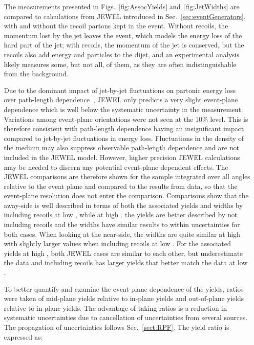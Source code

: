 The measurements presented in Figs.~\ref{fig:AssocYields} and~\ref{fig:JetWidths} are compared to calculations from JEWEL introduced in Sec.~\ref{sec:eventGenerators}, with and without the recoil partons kept in the event. Without recoils, the momentum lost by the jet leaves the event, which models the energy loss of the hard part of the jet; with recoils, the momentum of the jet is conserved, but the recoils also add energy and particles to the dijet, and an experimental analysis likely measures some, but not all, of them, as they are often indistinguishable from the background.

Due to the dominant impact of jet-by-jet fluctuations on partonic energy loss over path-length dependence~\cite{Milhano:2015mng,Zapp:2013zya}, JEWEL only predicts a very slight event-plane dependence which is well below the systematic uncertainty in the measurement.  Variations among event-plane orientations were not seen at the 10\% level.  This is therefore consistent with path-length dependence having an insignificant impact compared to jet-by-jet fluctuations in energy loss.  Fluctuations in the density of the medium may also suppress observable path-length dependence and are not included in the JEWEL model.  However,  higher precision JEWEL calculations may be needed to discern any potential event-plane dependent effects.  The JEWEL comparisons are therefore shown for the sample integrated over all angles relative to the event plane and compared to the results from data, so that the event-plane resolution does not enter the comparison.  Comparisons show that the away-side is well described in terms of both the associated yields and widths by including recoils at low , while at high , the yields are better described by not including recoils and the widths have similar results to within uncertainties for both cases.  When looking at the near-side, the widths are quite similar at high  with slightly larger values when including recoils at low .  For the associated yields at high , both JEWEL cases are similar to each other, but underestimate the data and including recoils has larger yields that better match the data at low .

\label{sect:YieldRatio}
To better quantify and examine the event-plane dependence of the yields, ratios were taken of mid-plane yields relative to in-plane yields and out-of-plane yields relative to in-plane yields.  The advantage of taking ratios is a reduction in systematic uncertainties due to cancellation of uncertainties from several sources.  The propagation of uncertainties follows Sec.~\ref{sect:RPF}.  The yield ratio is expressed as:

